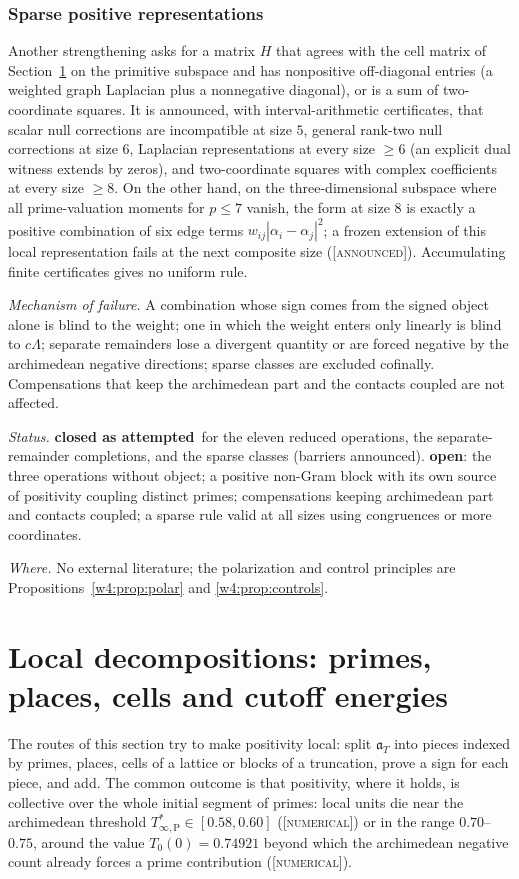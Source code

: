 \documentclass[11pt]{amsart}
\theoremstyle{definition}
\theoremstyle{remark}
\numberwithin{equation}{section}
\newcommand{\aT}{\mathfrak{a}_T}                       %
\newcommand{\Tarch}{T^{*}_{\infty,\mathrm P}}          %
\newcommand{\stag}[1]{\textsc{[#1]}}
\newcommand{\NUM}{\stag{numerical}}
\newcommand{\ANNOUNCED}{\stag{announced}}
\newcommand{\rtag}[1]{\textbf{\small\textsf{#1}}}
\newcommand{\closedA}{\rtag{closed as attempted}}
\newcommand{\openR}{\rtag{open}}
\newcommand{\entry}[1]{\par\smallskip\noindent\textit{#1.}\enspace}
\begin{document}
\subsubsection*{Sparse positive representations}
Another strengthening asks for a matrix $H$ that agrees with the cell matrix of Section~\ref{w4:sec:local} on the primitive
subspace and has nonpositive off-diagonal entries (a weighted graph Laplacian plus a nonnegative diagonal), or is a sum of
two-coordinate squares. It is announced, with interval-arithmetic certificates, that scalar null corrections are incompatible at
size $5$, general rank-two null corrections at size $6$, Laplacian representations at every size $\ge6$ (an explicit dual witness
extends by zeros), and two-coordinate squares with complex coefficients at every size $\ge8$. On the other hand, on the
three-dimensional subspace where all prime-valuation moments for $p\le7$ vanish, the form at size $8$ is exactly a positive
combination of six edge terms $w_{ij}|\alpha_i-\alpha_j|^2$; a frozen extension of this local representation fails at the next
composite size (\ANNOUNCED). Accumulating finite certificates gives no uniform rule.

\entry{Mechanism of failure} A combination whose sign comes from the signed object alone is blind to the weight; one in which the
weight enters only linearly is blind to $c\Lambda$; separate remainders lose a divergent quantity or are forced negative by the
archimedean negative directions; sparse classes are excluded cofinally. Compensations that keep the archimedean part and the
contacts coupled are not affected.

\entry{Status} \closedA\ for the eleven reduced operations, the separate-remainder completions, and the sparse classes (barriers
announced). \openR: the three operations without object; a positive non-Gram block with its own source of positivity coupling
distinct primes; compensations keeping archimedean part and contacts coupled; a sparse rule valid at all sizes using congruences or
more coordinates.

\entry{Where} No external literature; the polarization and control principles are Propositions~\ref{w4:prop:polar} and
\ref{w4:prop:controls}.


\section{Local decompositions: primes, places, cells and cutoff energies}\label{w4:sec:local}

The routes of this section try to make positivity local: split $\aT$ into pieces indexed by primes, places, cells of a lattice
or blocks of a truncation, prove a sign for each piece, and add. The common outcome is that positivity, where it holds, is
collective over the whole initial segment of primes: local units die near the archimedean threshold $\Tarch\in[0.58,0.60]$
(\NUM) or in the range $0.70$--$0.75$, around the value $T_0(0)=0.74921$ beyond which the archimedean negative count already
forces a prime contribution (\NUM).
\end{document}
